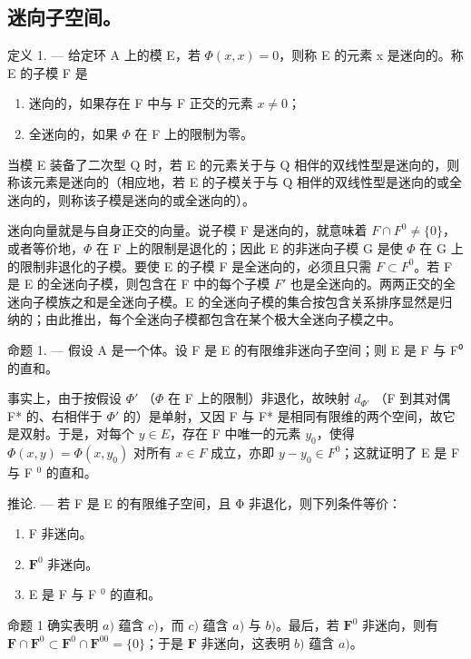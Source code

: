 \subsection{迷向子空间。}

定义 1. --- 给定环 A 上的模 E，若 \(\Phi(x, x) = 0\)，则称 E 的元素 x 是迷向的。称 E 的子模 F 是

\begin{enumerate}
\def\labelenumi{\arabic{enumi})}
\item
  迷向的，如果存在 F 中与 F 正交的元素 \(x \neq 0\)；
\item
  全迷向的，如果 \(\Phi\) 在 F 上的限制为零。
\end{enumerate}

当模 E 装备了二次型 Q 时，若 E 的元素关于与 Q 相伴的双线性型是迷向的，则称该元素是迷向的（相应地，若 E 的子模关于与 Q 相伴的双线性型是迷向的或全迷向的，则称该子模是迷向的或全迷向的）。

迷向向量就是与自身正交的向量。说子模 F 是迷向的，就意味着 \(F \cap F^{0} \neq \{0\}\)，或者等价地，\(\Phi\) 在 F 上的限制是退化的；因此 E 的非迷向子模 G 是使 \(\Phi\) 在 G 上的限制非退化的子模。要使 E 的子模 F 是全迷向的，必须且只需 \(F \subset F^{0}\)。若 F 是 E 的全迷向子模，则包含在 F 中的每个子模 \(F'\) 也是全迷向的。两两正交的全迷向子模族之和是全迷向子模。E 的全迷向子模的集合按包含关系排序显然是归纳的；由此推出，每个全迷向子模都包含在某个极大全迷向子模之中。

命题 1. --- 假设 A 是一个体。设 F 是 E 的有限维非迷向子空间；则 E 是 F 与 F⁰ 的直和。

事实上，由于按假设 \(\Phi'\) （\(\Phi\) 在 F 上的限制）非退化，故映射 \(d_{\Phi'}\) （F 到其对偶 F* 的、右相伴于 \(\Phi'\) 的）是单射，又因 F 与 F* 是相同有限维的两个空间，故它是双射。于是，对每个 \(y \in E\)，存在 F 中唯一的元素 \(y_0\)，使得 \(\Phi(x, y) = \Phi(x, y_0)\) 对所有 \(x \in F\) 成立，亦即 \(y - y_0 \in F^0\)；这就证明了 E 是 F 与 F \(^0\) 的直和。

推论. --- 若 F 是 E 的有限维子空间，且 Φ 非退化，则下列条件等价：

\begin{enumerate}
\def\labelenumi{\alph{enumi})}
\item
  F 非迷向。
\item
  \(\mathbf{F}^0\) 非迷向。
\item
  E 是 F 与 F \(^{0}\) 的直和。
\end{enumerate}

命题 1 确实表明 \(a)\) 蕴含 \(c)\)，而 \(c)\) 蕴含 \(a)\) 与 \(b)\)。最后，若 \(\mathbf{F}^0\) 非迷向，则有 \(\mathbf{F} \cap \mathbf{F}^0 \subset \mathbf{F}^0 \cap \mathbf{F}^{00} = \{0\}\)；于是 \(\mathbf{F}\) 非迷向，这表明 \(b)\) 蕴含 \(a)\)。

